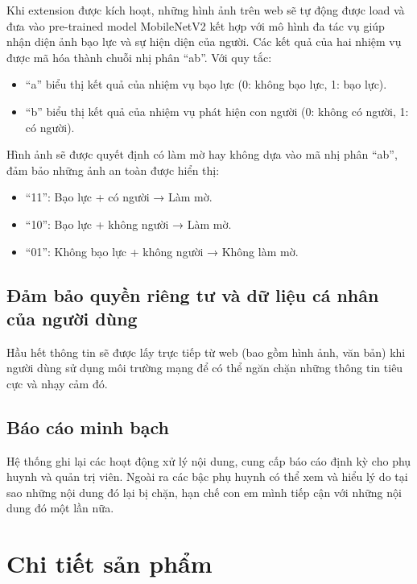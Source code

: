\documentclass[12pt,a4paper]{article}
\begin{document}
Khi extension được kích hoạt, những hình ảnh trên web sẽ tự động được load và đưa vào pre-trained model MobileNetV2 kết hợp với mô hình đa tác vụ giúp nhận diện ảnh bạo lực và sự hiện diện của người. Các kết quả của hai nhiệm vụ được mã hóa thành chuỗi nhị phân ``ab''. Với quy tắc:

\begin{itemize}
  \item ``a'' biểu thị kết quả của nhiệm vụ bạo lực (0: không bạo lực, 1: bạo lực).
  
  \item ``b'' biểu thị kết quả của nhiệm vụ phát hiện con người (0: không có người, 1: có người). 
\end{itemize}

Hình ảnh sẽ được quyết định có làm mờ hay không dựa vào mã nhị phân ``ab'', đảm bảo những ảnh an toàn được hiển thị:

\begin{itemize}
  \item ``11'': Bạo lực + có người → Làm mờ.
  
  \item ``10'': Bạo lực + không người → Làm mờ.
  
  \item ``01'': Không bạo lực + không người → Không làm mờ.
\end{itemize}

\subsection{Đảm bảo quyền riêng tư và dữ liệu cá nhân của người dùng}

Hầu hết thông tin sẽ được lấy trực tiếp từ web (bao gồm hình ảnh, văn bản) khi người dùng sử dụng môi trường mạng để có thể ngăn chặn những thông tin tiêu cực và nhạy cảm đó.

\subsection{Báo cáo minh bạch}

Hệ thống ghi lại các hoạt động xử lý nội dung, cung cấp báo cáo định kỳ cho phụ huynh và quản trị viên. Ngoài ra các bậc phụ huynh có thể xem và hiểu lý do tại sao những nội dung đó lại bị chặn, hạn chế con em mình tiếp cận với những nội dung đó một lần nữa.

\section{Chi tiết sản phẩm}
\end{document}
